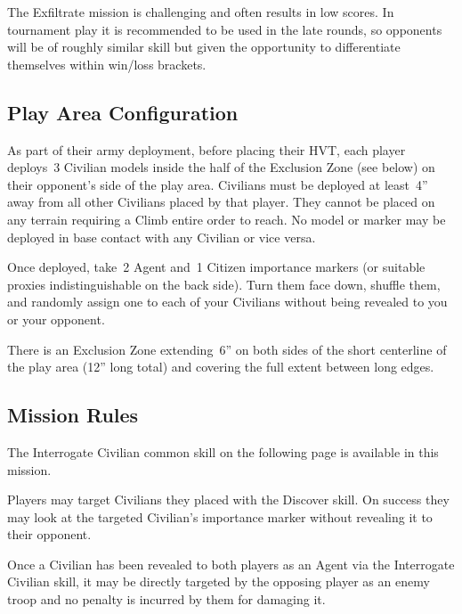 \label{mission:exfiltrate}

\begin{recon}
  The Exfiltrate mission is challenging and often results in low
  scores.  In tournament play it is recommended to be used in the late
  rounds, so opponents will be of roughly similar skill but given the
  opportunity to differentiate themselves within win/loss
  brackets.
\end{recon}

\subsection{Play Area Configuration}

As part of their army deployment, before placing their HVT, each
player deploys~3 Civilian models inside the half of the Exclusion Zone
(see below) on their opponent's side of the play area.  Civilians must
be deployed at least~4'' away from all other Civilians placed by that
player.  They cannot be placed on any terrain requiring a Climb entire
order to reach.  No model or marker may be deployed in base contact
with any Civilian or vice versa.

Once deployed, take~2 Agent and~1 Citizen importance markers (or
suitable proxies indistinguishable on the back side).  Turn them face
down, shuffle them, and randomly assign one to each of your Civilians
without being revealed to you or your opponent.

  There is an Exclusion Zone
extending~6'' on both sides of the short centerline of the play area
(12'' long total) and covering the full extent between long edges.

\subsection{Mission Rules}

The Interrogate Civilian common skill on the following page is
available in this mission.

Players may target Civilians they placed with the Discover skill.  On
success they may look at the targeted Civilian's importance marker
without revealing it to their opponent.

Once a Civilian has been revealed to both players as an Agent via the
Interrogate Civilian skill, it may be directly targeted by the
opposing player as an enemy troop and no penalty is incurred by them
for damaging it.

